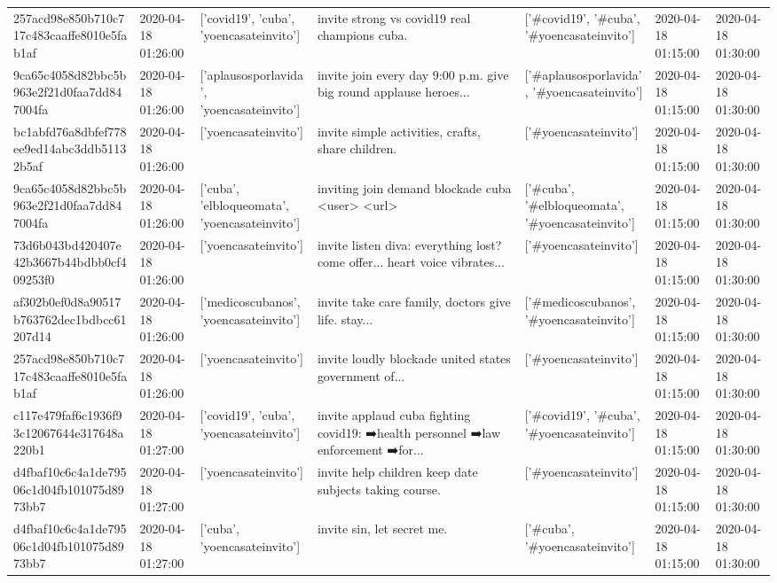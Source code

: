 \begin{tabular}{lllllll}
257acd98e850b710c717c483caaffe8010e5fab1af & 2020-04-18 01:26:00 & ['covid19', 'cuba', 'yoencasateinvito'] & invite strong vs covid19 real champions cuba. & ['#covid19', '#cuba', '#yoencasateinvito'] & 2020-04-18 01:15:00 & 2020-04-18 01:30:00 \\
9ca65c4058d82bbc5b963e2f21d0faa7dd847004fa & 2020-04-18 01:26:00 & ['aplausosporlavida', 'yoencasateinvito'] & invite join every day 9:00 p.m. give big round applause heroes... & ['#aplausosporlavida', '#yoencasateinvito'] & 2020-04-18 01:15:00 & 2020-04-18 01:30:00 \\
bc1abfd76a8dbfef778ee9ed14abc3ddb51132b5af & 2020-04-18 01:26:00 & ['yoencasateinvito'] & invite simple activities, crafts, share children. & ['#yoencasateinvito'] & 2020-04-18 01:15:00 & 2020-04-18 01:30:00 \\
9ca65c4058d82bbc5b963e2f21d0faa7dd847004fa & 2020-04-18 01:26:00 & ['cuba', 'elbloqueomata', 'yoencasateinvito'] & inviting join demand blockade cuba <user> <url> & ['#cuba', '#elbloqueomata', '#yoencasateinvito'] & 2020-04-18 01:15:00 & 2020-04-18 01:30:00 \\
73d6b043bd420407e42b3667b44bdbb0cf409253f0 & 2020-04-18 01:26:00 & ['yoencasateinvito'] & invite listen diva: everything lost? come offer... heart voice vibrates... & ['#yoencasateinvito'] & 2020-04-18 01:15:00 & 2020-04-18 01:30:00 \\
af302b0ef0d8a90517b763762dec1bdbcc61207d14 & 2020-04-18 01:26:00 & ['medicoscubanos', 'yoencasateinvito'] & invite take care family, doctors give life. stay... & ['#medicoscubanos', '#yoencasateinvito'] & 2020-04-18 01:15:00 & 2020-04-18 01:30:00 \\
257acd98e850b710c717c483caaffe8010e5fab1af & 2020-04-18 01:26:00 & ['yoencasateinvito'] & invite loudly blockade united states government of... & ['#yoencasateinvito'] & 2020-04-18 01:15:00 & 2020-04-18 01:30:00 \\
c117e479faf6c1936f93c12067644e317648a220b1 & 2020-04-18 01:27:00 & ['covid19', 'cuba', 'yoencasateinvito'] & invite applaud cuba fighting covid19: ➡️health personnel ➡️law enforcement ➡️for... & ['#covid19', '#cuba', '#yoencasateinvito'] & 2020-04-18 01:15:00 & 2020-04-18 01:30:00 \\
d4fbaf10c6c4a1de79506c1d04fb101075d8973bb7 & 2020-04-18 01:27:00 & ['yoencasateinvito'] & invite help children keep date subjects taking course. & ['#yoencasateinvito'] & 2020-04-18 01:15:00 & 2020-04-18 01:30:00 \\
d4fbaf10c6c4a1de79506c1d04fb101075d8973bb7 & 2020-04-18 01:27:00 & ['cuba', 'yoencasateinvito'] & invite sin, let secret me. & ['#cuba', '#yoencasateinvito'] & 2020-04-18 01:15:00 & 2020-04-18 01:30:00 \\

\end{tabular}
